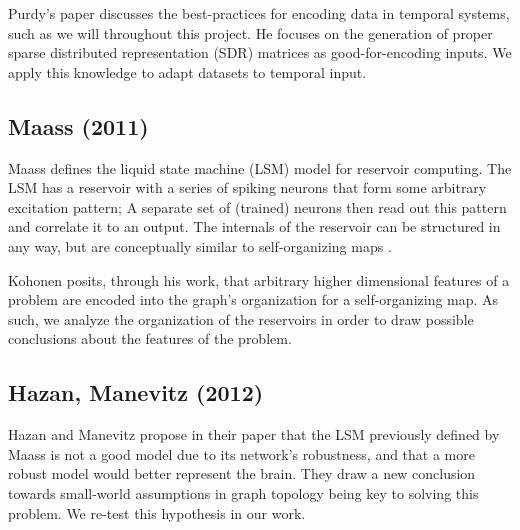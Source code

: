 Purdy's paper \cite{Encoding} discusses the best-practices for encoding data in
temporal systems, such as we will throughout this project. He focuses on the
generation of proper sparse distributed representation (SDR) matrices as
good-for-encoding inputs. We apply this knowledge to adapt datasets to temporal
input.

\subsection{Maass (2011)}

Maass defines the liquid state machine (LSM) \cite{LSM} model for reservoir
computing. The LSM has a reservoir with a series of spiking neurons that form
some arbitrary excitation pattern; A separate set of (trained) neurons then read
out this pattern and correlate it to an output. The internals of the reservoir
can be structured in any way, but are conceptually similar to self-organizing
maps \cite{Kohonen}.

Kohonen posits, through his work, that arbitrary higher dimensional features of
a problem are encoded into the graph's organization for a self-organizing map.
As such, we analyze the organization of the reservoirs in order to draw
possible conclusions about the features of the problem.

\subsection{Hazan, Manevitz (2012)}

Hazan and Manevitz \cite{LSM Constraints} propose in their paper that the LSM
previously defined by Maass is not a good model due to its network's robustness,
and that a more robust model would better represent the brain. They draw a new
conclusion towards small-world assumptions in graph topology being key to
solving this problem. We re-test this hypothesis in our work.